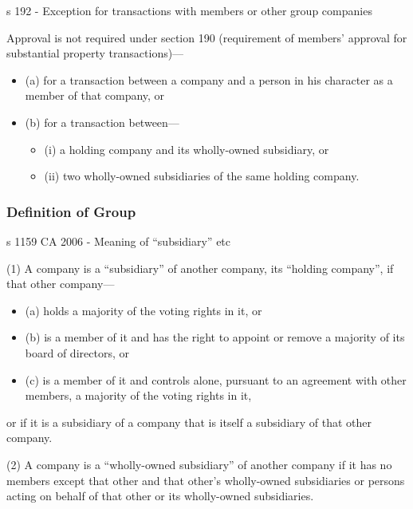 \documentclass[
]{article}
\providecommand{\tightlist}{%
  \setlength{\itemsep}{0pt}\setlength{\parskip}{0pt}}
\newenvironment{env-b668fda5-661a-4463-a3e4-043f904202e1}
{
    \savenotes\tcolorbox[blanker,breakable,left=5pt,borderline west={2pt}{-4pt}{green}]
}
{
    \endtcolorbox\spewnotes
}
\begin{document}
\begin{env-b668fda5-661a-4463-a3e4-043f904202e1}

s 192 - Exception for transactions with members or other group companies

Approval is not required under section 190 (requirement of members'
approval for substantial property transactions)---

\begin{itemize}
\tightlist
\item
  (a) for a transaction between a company and a person in his character
  as a member of that company, or
\item
  (b) for a transaction between---

  \begin{itemize}
  \tightlist
  \item
    (i) a holding company and its wholly-owned subsidiary, or
  \item
    (ii) two wholly-owned subsidiaries of the same holding company.
  \end{itemize}
\end{itemize}

\end{env-b668fda5-661a-4463-a3e4-043f904202e1}

\hypertarget{definition-of-group}{%
\subsubsection{Definition of Group}\label{definition-of-group}}

\begin{env-b668fda5-661a-4463-a3e4-043f904202e1}

s 1159 CA 2006 - Meaning of ``subsidiary'' etc

(1) A company is a ``subsidiary'' of another company, its ``holding
company'', if that other company---

\begin{itemize}
\tightlist
\item
  (a) holds a majority of the voting rights in it, or
\item
  (b) is a member of it and has the right to appoint or remove a
  majority of its board of directors, or
\item
  (c) is a member of it and controls alone, pursuant to an agreement
  with other members, a majority of the voting rights in it,
\end{itemize}

or if it is a subsidiary of a company that is itself a subsidiary of
that other company.

(2) A company is a ``wholly-owned subsidiary'' of another company if it
has no members except that other and that other's wholly-owned
subsidiaries or persons acting on behalf of that other or its
wholly-owned subsidiaries.

\end{env-b668fda5-661a-4463-a3e4-043f904202e1}
\end{document}

